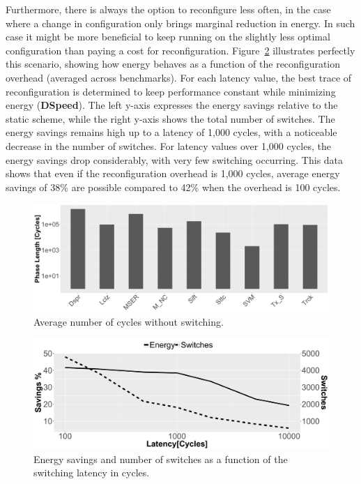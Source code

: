 Furthermore, there is always the option to reconfigure less often, in the case where a change in configuration only brings marginal reduction in energy.
In such case it might be more beneficial to keep running on the slightly less optimal configuration than paying a cost for reconfiguration.
Figure~\ref{fig:enlatency} illustrates perfectly this scenario, showing how energy behaves as a function of the reconfiguration overhead (averaged across benchmarks).
For each latency value, the best trace of reconfiguration is determined to keep performance constant while minimizing energy (\textbf{DSpeed}).
The left y-axis expresses the energy savings relative to the static scheme, while the right y-axis shows the total number of switches.
The energy savings remains high up to a latency of 1,000 cycles, with a noticeable decrease in the number of switches.
For latency values over 1,000 cycles, the energy savings drop considerably, with very few switching occurring.
This data shows that even if the reconfiguration overhead is 1,000 cycles, average energy savings of 38\% are possible compared to 42\% when the overhead is 100 cycles.

\begin{figure}[t]
    \centering
	\includegraphics[width=\textwidth]{cases-paper/graphics/Exploration/phase_len2.pdf}
    \caption{Average number of cycles without switching.}
    \label{fig:avlen}
\vspace{1em}
\end{figure}
\begin{figure}[t]
\centering
	\includegraphics[width=\textwidth]{cases-paper/graphics/Exploration/latency_en_sp_sw2.pdf}
    \caption{Energy savings and number of switches as a function of the switching latency in cycles.}
    \label{fig:enlatency}
\vspace{5mm}
\end{figure}

